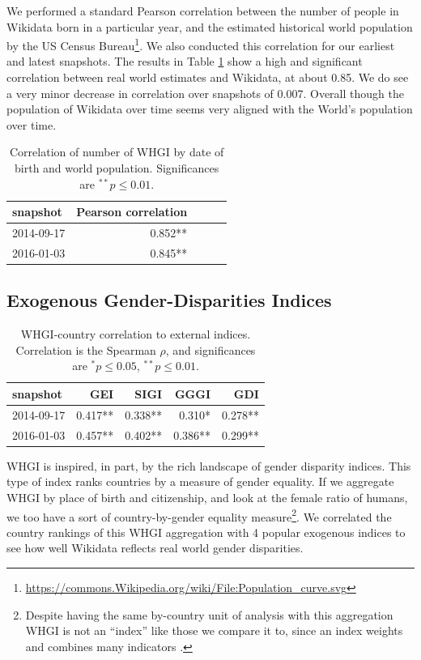\documentclass[letterpaper]{article}
\begin{document}
We performed a standard Pearson correlation between the number of people in Wikidata born in a particular year, and the estimated historical world population by the US Census
Bureau\footnote{\url{https://commons.Wikipedia.org/wiki/File:Population_curve.svg}}.
We also conducted this correlation for our earliest and latest snapshots. The results in Table \ref{table:worldpop} show a high and significant correlation between real world estimates and Wikidata, at about 0.85. We do see a very minor decrease in correlation over snapshots of 0.007. Overall though the population of Wikidata over time seems very aligned with the World's population over time.

\begin{table}
\caption{Correlation of number of WHGI by date of birth and world population. Significances are $ ^{**}p\leq 0.01$.}
\label{table:worldpop}
\begin{tabular}{lrrrr}
\toprule
snapshot &  Pearson correlation \\
\midrule
2014-09-17 & 0.852**  \\
2016-01-03 & 0.845**  \\
\bottomrule
\end{tabular}
\end{table}

\subsection{Exogenous Gender-Disparities Indices}
\begin{table}
\caption{WHGI-country correlation to external indices. Correlation is the Spearman $\rho$, and significances are $ ^*p\leq 0.05 $, $ ^{**}p\leq 0.01$.}
\label{table:scores}
\begin{tabular}{lrrrr}
\toprule
snapshot &  GEI &  SIGI &  GGGI &  GDI  \\
\midrule
2014-09-17 &  0.417** &       0.338** &          0.310* &         0.278**  \\
2016-01-03 &  0.457** &       0.402** &          0.386** &         0.299**  \\
\bottomrule
\end{tabular}
\end{table}

WHGI is inspired, in part, by the rich landscape of gender disparity indices. This type of index ranks countries by a measure of gender equality. If we aggregate WHGI by place of birth and citizenship, and look at the female ratio of humans, we too have a sort of country-by-gender equality measure\footnote{Despite having the same by-country unit of analysis with this aggregation WHGI is not an ``index'' like those we compare it to, since an index weights and combines many indicators \cite{rossi_handbook_1980}. }.  We correlated the country rankings of this WHGI aggregation with 4 popular exogenous indices to see how well Wikidata reflects real world gender disparities.
\end{document}
